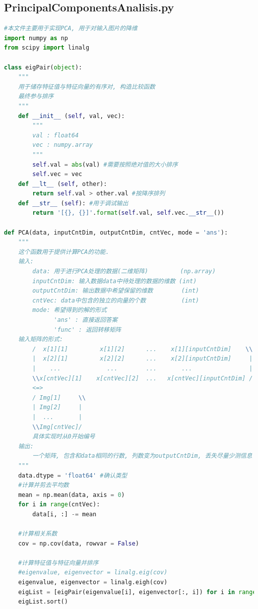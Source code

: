 \documentclass[fleqn,10pt]{SelfArx} %
\begin{document}
\subsection*{PrincipalComponentsAnalisis.py}
\begin{lstlisting}[language=python]
#本文件主要用于实现PCA, 用于对输入图片的降维
import numpy as np
from scipy import linalg

class eigPair(object):
    """
    用于储存特征值与特征向量的有序对, 构造比较函数
    最终参与排序
    """
    def __init__ (self, val, vec):
        """
        val : float64
        vec : numpy.array
        """
        self.val = abs(val) #需要按照绝对值的大小排序
        self.vec = vec
    def __lt__ (self, other):
        return self.val > other.val #按降序排列
    def __str__ (self): #用于调试输出
        return '[{}, {}]'.format(self.val, self.vec.__str__())

def PCA(data, inputCntDim, outputCntDim, cntVec, mode = 'ans'):
    """
    这个函数用于提供计算PCA的功能.
    输入: 
        data: 用于进行PCA处理的数据(二维矩阵)         (np.array)
        inputCntDim: 输入数据data中待处理的数据的维数 (int)
        outputCntDim: 输出数据中希望保留的维数        (int)
        cntVec: data中包含的独立的向量的个数          (int)
        mode: 希望得到的解的形式
              'ans' : 直接返回答案
              'func' : 返回转移矩阵
    输入矩阵的形式:
        /  x[1][1]         x[1][2]      ...    x[1][inputCntDim]    \\
        |  x[2][1]         x[2][2]      ...    x[2][inputCntDim]     |
        |    ...             ...        ...       ...                |
        \\x[cntVec][1]    x[cntVec][2]  ...   x[cntVec][inputCntDim] /
        <=>
        / Img[1]     \\
        | Img[2]     |
        |  ...       |
        \\Img[cntVec]/
        具体实现时从0开始编号
    输出:
        一个矩阵, 包含和data相同的行数, 列数变为outputCntDim, 丢失尽量少测信息
    """
    data.dtype = 'float64' #确认类型
    #计算并剪去平均数
    mean = np.mean(data, axis = 0)
    for i in range(cntVec):
        data[i, :] -= mean

    #计算相关系数
    cov = np.cov(data, rowvar = False)
    
    #计算特征值与特征向量并排序
    #eigenvalue, eigenvector = linalg.eig(cov)
    eigenvalue, eigenvector = linalg.eigh(cov)
    eigList = [eigPair(eigenvalue[i], eigenvector[:, i]) for i in range(inputCntDim)]
    eigList.sort()


\end{lstlisting}
\end{document}
